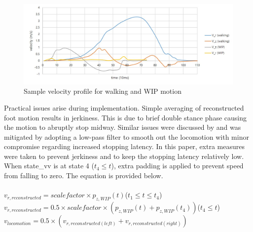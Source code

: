 \begin{figure}[th]
\captionsetup{justification=raggedright,singlelinecheck=false}
\centering
\includegraphics[width=\textwidth,height=\textheight,keepaspectratio]{Figures/cycloid_profile.jpg}
\decoRule
\caption[Sample velocity profile for walking and WIP motion]{Sample velocity profile for walking and WIP motion}
\label{fig:cycloid}
\end{figure}
\noindent
Practical issues arise during implementation. Simple averaging of reconstructed foot motion results in jerkiness. This is due to brief double stance phase causing the motion to abruptly stop midway. Similar issues were discussed by \citep{Fea08} and was mitigated by adopting a low-pass filter to smooth out the locomotion with minor compromise regarding increased stopping latency. In this paper, extra measures were taken to prevent jerkiness and to keep the stopping latency relatively low. When state\_vv is at state 4 ($t_{4}\leq t$), extra padding is applied to prevent speed from falling to zero. The equation is provided below.
\\\\
\indent
$v_{r, reconstructed} = scale factor\times p_{z, WIP}(t)$\indent($t_{1}\leq t\leq t_{4}$)\\
\indent
$v_{r, reconstructed} = 0.5\times scale factor\times (p_{z, WIP}(t) + p_{z, WIP}(t_{4}))$\indent($t_{4}\leq t$)\\
\indent
$v_{locomotion} = 0.5\times(v_{r, reconstructed (left)} + v_{r, reconstructed (right)})$

